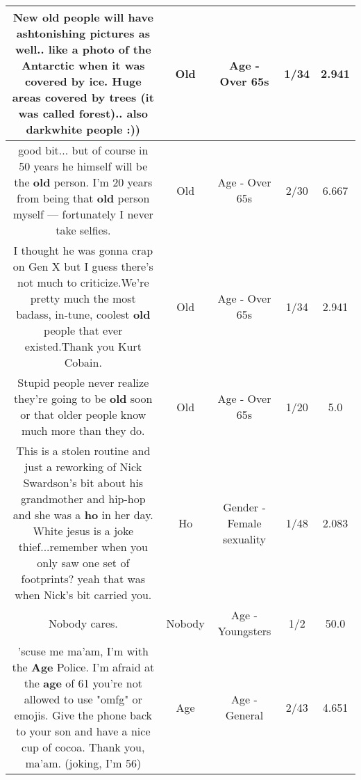 \documentclass[11pt]{article}
\newlength\mylength
\begin{document}
\begin{center}
\begin{longtable}{|C{.65\mylength}|C{.30\mylength}|C{.12\mylength}|C{.12\mylength}|C{.12\mylength}|}
  \small New \textbf{old} people will have ashtonishing pictures as well.. like a photo of the Antarctic when it was covered by ice. Huge areas covered by trees (it was called forest).. also darkwhite people :))\normalsize   & Old & Age - Over 65s & 1/34 & 2.941 \\  \hline
  \small good bit... but of course in 50 years he himself will be the \textbf{old} person.  I'm 20 years from being that \textbf{old} person myself --- fortunately I never take selfies.\normalsize   & Old & Age - Over 65s & 2/30 & 6.667 \\  \hline
  \small I thought he was gonna crap on Gen X but I guess there's not much to criticize.We're pretty much the most badass, in-tune, coolest \textbf{old} people that ever existed.Thank you Kurt Cobain.\normalsize   & Old & Age - Over 65s & 1/34 & 2.941 \\  \hline
  \small Stupid people never realize they're going to be \textbf{old} soon or that older people know much more than they do.\normalsize   & Old & Age - Over 65s & 1/20 & 5.0 \\  \hline
  \small This is a stolen routine and just a reworking of Nick Swardson's bit about his grandmother and hip-hop and she was a \textbf{ho} in her day. White jesus is a joke thief...remember when you only saw one set of footprints? yeah that was when Nick's bit carried you.\normalsize   & Ho & Gender - Female sexuality & 1/48 & 2.083 \\  \hline
  \small Nobody cares.\normalsize   & Nobody & Age - Youngsters & 1/2 & 50.0 \\  \hline
  \small 'scuse me ma'am, I'm with the \textbf{Age} Police. I'm afraid at the \textbf{age} of 61 you're not allowed to use "omfg" or emojis. Give the phone back to your son and have a nice cup of cocoa. Thank you, ma'am. (joking, I'm 56)\normalsize   & Age & Age - General & 2/43 & 4.651 \\  \hline

\end{longtable}
\end{center}
\end{document}
